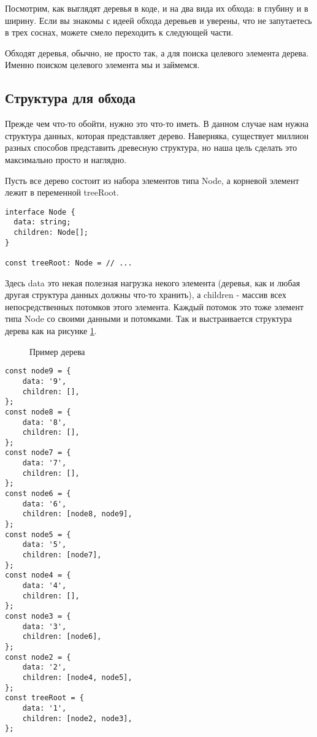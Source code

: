 \documentclass[../article.tex]{subfiles}
\begin{document}
{Посмотрим, как выглядят деревья в коде, и на два вида их обхода: в глубину и в ширину. Если вы знакомы с идеей обхода деревьев и уверены, что не запутаетесь в трех соснах, можете смело переходить к следующей части.}

Обходят деревья, обычно, не просто так, а для поиска целевого элемента дерева. Именно поиском целевого элемента мы и займемся.

\subsection{Структура для обхода}

Прежде чем что-то обойти, нужно это что-то иметь. В данном случае нам нужна структура данных, которая представляет дерево. Наверняка, существует миллион разных способов представить древесную структура, но наша цель сделать это максимально просто и наглядно.

Пусть все дерево состоит из набора элементов типа {\firacodebold Node}, а корневой элемент лежит в переменной {\firacodebold treeRoot}.
    \begin{ruledelement}
        \begin{lstlisting}[label={lst:treeStructure}]
interface Node {
  data: string;
  children: Node[];
}

const treeRoot: Node = // ...
        \end{lstlisting}
    \end{ruledelement}

Здесь {\firacodebold data} это некая полезная нагрузка некого элемента (деревья, как и любая другая структура данных должны что-то хранить), а {\firacodebold children} - массив всех непосредственных потомков этого элемента. Каждый потомок это тоже элемент типа {\firacodebold Node} со своими данными и потомками. Так и выстраивается структура дерева как на рисунке \ref{fig:exampleTree}.

\begin{figure}[t!]
    \caption{Пример дерева}
    \label{fig:exampleTree}
\end{figure}


    \begin{ruledelement}
        \begin{lstlisting}[caption={Пример {\firacodebold treeRoot}}, label={lst:treeJson}]
const node9 = {
    data: '9',
    children: [],
};
const node8 = {
    data: '8',
    children: [],
};
const node7 = {
    data: '7',
    children: [],
};
const node6 = {
    data: '6',
    children: [node8, node9],
};
const node5 = {
    data: '5',
    children: [node7],
};
const node4 = {
    data: '4',
    children: [],
};
const node3 = {
    data: '3',
    children: [node6],
};
const node2 = {
    data: '2',
    children: [node4, node5],
};
const treeRoot = {
    data: '1',
    children: [node2, node3],
};
        \end{lstlisting}
    \end{ruledelement}
\end{document}
